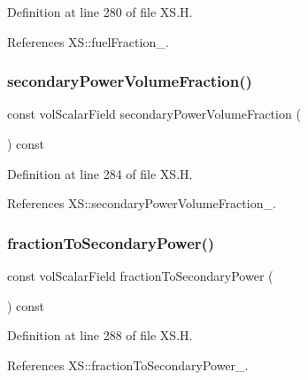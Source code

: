 Definition at line 280 of file X\+S.\+H.



References X\+S\+::fuel\+Fraction\+\_\+.

\mbox{\label{classFoam_1_1XS_a52899ae5805771cf443d9a7e6ba81dc5}} 
\subsubsection{\texorpdfstring{secondary\+Power\+Volume\+Fraction()}{secondaryPowerVolumeFraction()}}
{\footnotesize\ttfamily const vol\+Scalar\+Field secondary\+Power\+Volume\+Fraction (\begin{DoxyParamCaption}{ }\end{DoxyParamCaption}) const\hspace{0.3cm}{\ttfamily [inline]}}



Definition at line 284 of file X\+S.\+H.



References X\+S\+::secondary\+Power\+Volume\+Fraction\+\_\+.

\mbox{\label{classFoam_1_1XS_aa8387c8a487d8285a32ef61af121e35e}} 
\subsubsection{\texorpdfstring{fraction\+To\+Secondary\+Power()}{fractionToSecondaryPower()}}
{\footnotesize\ttfamily const vol\+Scalar\+Field fraction\+To\+Secondary\+Power (\begin{DoxyParamCaption}{ }\end{DoxyParamCaption}) const\hspace{0.3cm}{\ttfamily [inline]}}



Definition at line 288 of file X\+S.\+H.



References X\+S\+::fraction\+To\+Secondary\+Power\+\_\+.

